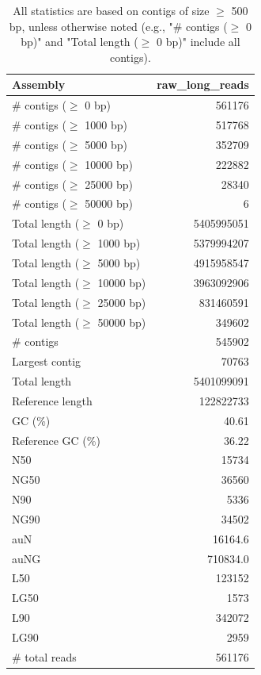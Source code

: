 \documentclass[12pt,a4paper]{article}
\begin{document}
\begin{table}[ht]
\begin{center}
\caption{All statistics are based on contigs of size $\geq$ 500 bp, unless otherwise noted (e.g., "\# contigs ($\geq$ 0 bp)" and "Total length ($\geq$ 0 bp)" include all contigs).}
\begin{tabular}{|l*{1}{|r}|}
\hline
Assembly & raw\_long\_reads \\ \hline
\# contigs ($\geq$ 0 bp) & 561176 \\ \hline
\# contigs ($\geq$ 1000 bp) & 517768 \\ \hline
\# contigs ($\geq$ 5000 bp) & 352709 \\ \hline
\# contigs ($\geq$ 10000 bp) & 222882 \\ \hline
\# contigs ($\geq$ 25000 bp) & 28340 \\ \hline
\# contigs ($\geq$ 50000 bp) & 6 \\ \hline
Total length ($\geq$ 0 bp) & 5405995051 \\ \hline
Total length ($\geq$ 1000 bp) & 5379994207 \\ \hline
Total length ($\geq$ 5000 bp) & 4915958547 \\ \hline
Total length ($\geq$ 10000 bp) & 3963092906 \\ \hline
Total length ($\geq$ 25000 bp) & 831460591 \\ \hline
Total length ($\geq$ 50000 bp) & 349602 \\ \hline
\# contigs & 545902 \\ \hline
Largest contig & 70763 \\ \hline
Total length & 5401099091 \\ \hline
Reference length & 122822733 \\ \hline
GC (\%) & 40.61 \\ \hline
Reference GC (\%) & 36.22 \\ \hline
N50 & 15734 \\ \hline
NG50 & 36560 \\ \hline
N90 & 5336 \\ \hline
NG90 & 34502 \\ \hline
auN & 16164.6 \\ \hline
auNG & 710834.0 \\ \hline
L50 & 123152 \\ \hline
LG50 & 1573 \\ \hline
L90 & 342072 \\ \hline
LG90 & 2959 \\ \hline
\# total reads & 561176 \\ \hline

\end{tabular}
\end{center}
\end{table}
\end{document}
